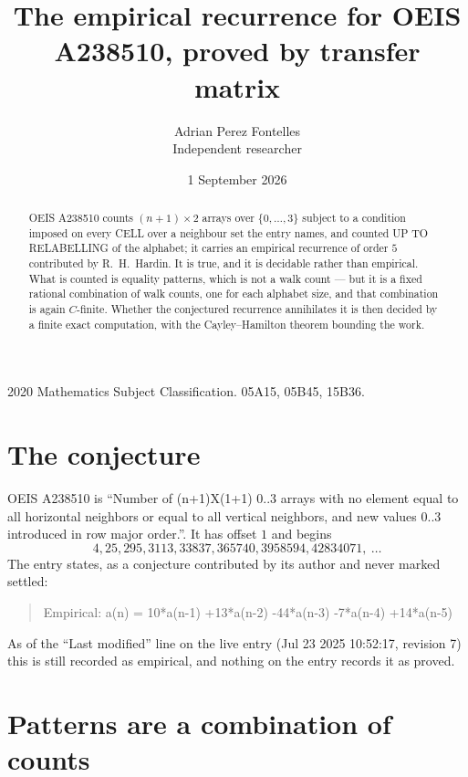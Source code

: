 \documentclass[11pt,a4paper]{article}
\title{The empirical recurrence for OEIS A238510, proved by transfer matrix}
\author{Adrian Perez Fontelles\\ \small Independent researcher}
\date{1 September 2026}
\theoremstyle{plain}
\theoremstyle{definition}
\begin{document}
\maketitle

\begin{abstract}
OEIS A238510 counts $(n+1)\times2$ arrays over $\{0,\dots,3\}$ subject to a condition imposed on
every CELL over a neighbour set the entry names, and counted UP TO RELABELLING of the
alphabet; it carries an empirical recurrence of order $5$ contributed by
R.~H.~Hardin. It is true, and it is decidable rather than empirical. What is counted is
equality patterns, which is not a walk count --- but it is a fixed rational combination of
walk counts, one for each alphabet size, and that combination is again $C$-finite. Whether the
conjectured recurrence annihilates it is then decided by a finite exact computation, with the
Cayley--Hamilton theorem bounding the work.
\end{abstract}

\noindent\small 2020 Mathematics Subject Classification. 05A15, 05B45, 15B36.\normalsize

\section{The conjecture}

OEIS A238510 is ``Number of (n+1)X(1+1) 0..3 arrays with no element equal to all horizontal neighbors or equal to all vertical neighbors, and new values 0..3 introduced in row major order.''. It has offset $1$ and begins
\[
4, 25, 295, 3113, 33837, 365740, 3958594, 42834071,\ \dots
\]
The entry states, as a conjecture contributed by its author and never marked settled:
\begin{quote}
Empirical: a(n) = 10*a(n-1) +13*a(n-2) -44*a(n-3) -7*a(n-4) +14*a(n-5)
\end{quote}
As of the ``Last modified'' line on the live entry (Jul 23 2025 10:52:17, revision 7) this is still
recorded as empirical, and nothing on the entry records it as proved.

\section{Patterns are a combination of counts}
\end{document}
